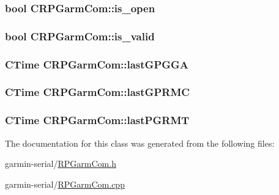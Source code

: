 \label{classCRPGarmCom_af309c1b2cacb0d9c11156890c7e9777d}
\hypertarget{classCRPGarmCom_a11b1a8233c49119c46f24b1de4c62685}{
\subsubsection[{is\_\-open}]{\setlength{\rightskip}{0pt plus 5cm}bool {\bf CRPGarmCom::is\_\-open}}}
\label{classCRPGarmCom_a11b1a8233c49119c46f24b1de4c62685}
\hypertarget{classCRPGarmCom_a3bd878214f7f921f003d743aa321cfd2}{
\subsubsection[{is\_\-valid}]{\setlength{\rightskip}{0pt plus 5cm}bool {\bf CRPGarmCom::is\_\-valid}}}
\label{classCRPGarmCom_a3bd878214f7f921f003d743aa321cfd2}
\hypertarget{classCRPGarmCom_a8a982dc5a3c374108e95d94a3a968c9b}{
\subsubsection[{lastGPGGA}]{\setlength{\rightskip}{0pt plus 5cm}CTime {\bf CRPGarmCom::lastGPGGA}}}
\label{classCRPGarmCom_a8a982dc5a3c374108e95d94a3a968c9b}
\hypertarget{classCRPGarmCom_a77709891a71132ed0f4673d6fb3bbdf2}{
\subsubsection[{lastGPRMC}]{\setlength{\rightskip}{0pt plus 5cm}CTime {\bf CRPGarmCom::lastGPRMC}}}
\label{classCRPGarmCom_a77709891a71132ed0f4673d6fb3bbdf2}
\hypertarget{classCRPGarmCom_ac23675cb58d274ca7ff1f20027feb314}{
\subsubsection[{lastPGRMT}]{\setlength{\rightskip}{0pt plus 5cm}CTime {\bf CRPGarmCom::lastPGRMT}}}
\label{classCRPGarmCom_ac23675cb58d274ca7ff1f20027feb314}


The documentation for this class was generated from the following files:\begin{DoxyCompactItemize}
\item 
garmin-\/serial/\hyperlink{RPGarmCom_8h}{RPGarmCom.h}\item 
garmin-\/serial/\hyperlink{RPGarmCom_8cpp}{RPGarmCom.cpp}\end{DoxyCompactItemize}

